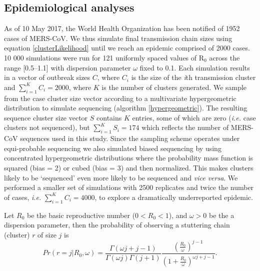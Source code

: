 \documentclass[11pt,oneside,letterpaper]{article}
\begin{document}
\subsection*{Epidemiological analyses}

As of 10 May 2017, the World Health Organization has been notified of 1952 cases of MERS-CoV.
We thus simulate final transmission chain sizes using equation \ref{clusterLikelihood} \citep{lloyd-smith_superspreading_2005,blumberg_inference_2013} until we reach an epidemic comprised of 2000 cases.
10 000 simulations were run for 121 uniformly spaced values of R$_{0}$ across the range [0.5--1.1] with dispersion parameter $\omega$ fixed to 0.1.
Each simulation results in a vector of outbreak sizes $C$, where $C_{i}$ is the size of the \textit{i}th transmission cluster and $\sum_{i=1}^{K} C_{i} = 2000$, where $K$ is the number of clusters generated.
We sample from the case cluster size vector according to a multivariate hypergeometric distribution to simulate sequencing (algorithm \ref{hypergeometric}).
The resulting sequence cluster size vector $S$ contains $K$ entries, some of which are zero (\textit{i.e.} case clusters not sequenced), but $\sum_{i=1}^{K} S_{i} = 174$ which reflects the number of MERS-CoV sequences used in this study.
Since the sampling scheme operates under equi-probable sequencing we also simulated biased sequencing by using concentrated hypergeometric distributions where the probability mass function is squared (bias = 2) or cubed (bias = 3) and then normalized.
This makes clusters likely to be `sequenced' even more likely to be sequenced and \textit{vice versa}.
We performed a smaller set of simulations with 2500 replicates and twice the number of cases, \textit{i.e.} $\sum_{i=1}^{K} C_{i} = 4000$, to explore a dramatically underreported epidemic.

Let $R_{0}$ be the basic reproductive number ($ 0 < R_{0} < 1$),  and $\omega > 0$ be the a dispersion parameter, then the probability of observing a stuttering chain (cluster) $r$ of size $j$ is~\citep{blumberg_inference_2013}
\begin{equation}
Pr(r = j | R_{0}, \omega) = \frac{\Gamma(\omega j+j-1)}{\Gamma(\omega j)\Gamma(j+1)} \frac{(\frac{R_{0}}{\omega})^{j-1}}{(1+\frac{R_{0}}{\omega})^{\omega j+j-1}}.
\label{clusterLikelihood}
\end{equation}
\end{document}
